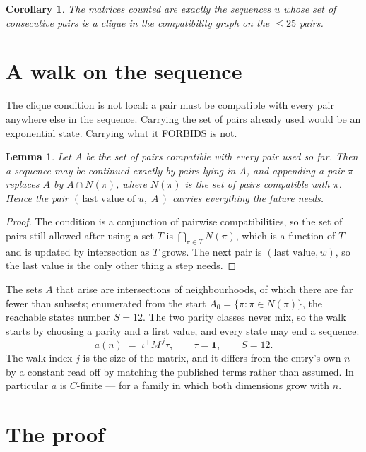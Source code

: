 \documentclass[11pt,a4paper]{article}
\theoremstyle{plain}
\newtheorem{lemma}[theorem]{Lemma}
\newtheorem{corollary}[theorem]{Corollary}
\theoremstyle{definition}
\begin{document}
\begin{corollary}
The matrices counted are exactly the sequences $u$ whose set of consecutive pairs is a clique in
the compatibility graph on the $\le 25$ pairs.
\end{corollary}

\section{A walk on the sequence}

The clique condition is not local: a pair must be compatible with every pair anywhere else in
the sequence. Carrying the set of pairs already used would be an exponential state. Carrying
what it FORBIDS is not.

\begin{lemma}\label{lem:lump}
Let $A$ be the set of pairs compatible with every pair used so far. Then a sequence may be
continued exactly by pairs lying in $A$, and appending a pair $\pi$ replaces $A$ by
$A\cap N(\pi)$, where $N(\pi)$ is the set of pairs compatible with $\pi$. Hence the pair
$(\,\text{last value of }u,\;A\,)$ carries everything the future needs.
\end{lemma}

\begin{proof}
The condition is a conjunction of pairwise compatibilities, so the set of pairs still allowed
after using a set $T$ is $\bigcap_{\pi\in T}N(\pi)$, which is a function of $T$ and is updated
by intersection as $T$ grows. The next pair is $(\text{last value},w)$, so the last value is
the only other thing a step needs.
\end{proof}

The sets $A$ that arise are intersections of neighbourhoods, of which there are far fewer than
subsets; enumerated from the start $A_0=\{\pi:\pi\in N(\pi)\}$, the reachable states number
$S=12$. The two parity classes never mix, so the walk starts by choosing a parity and a first
value, and every state may end a sequence:
\[
a(n)\;=\;\iota^{\!\top}M^{\,j}\tau ,\qquad \tau=\mathbf{1},\qquad S=12.
\]
The walk index $j$ is the size of the matrix, and it differs from the entry's own $n$ by a
constant read off by matching the published terms rather than assumed. In particular $a$ is
$C$-finite --- for a family in which both dimensions grow with $n$.

\section{The proof}
\end{document}
